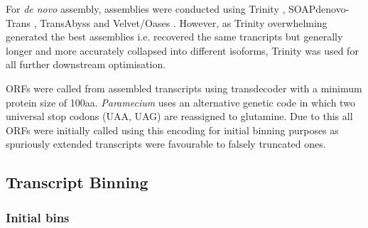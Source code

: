 For \textit{de novo} assembly, assemblies were conducted using Trinity \citep{Grabherr2011}, 
SOAPdenovo-Trans \citep{Xie2014}, TransAbyss \citep{Robertson2010} and Velvet/Oases \citep{Schulz2012}.
However, as Trinity overwhelming generated the best assemblies i.e. recovered the same trancripts
but generally longer and more accurately collapsed into different isoforms, Trinity was 
used for all further downstream optimisation.


ORFs were called from assembled transcripts using transdecoder \citep{Haas2013} with 
a minimum protein size of 100aa.  \textit{Paramecium} uses an alternative
genetic code in which two universal stop codons (UAA, UAG) are reassigned to glutamine.
Due to this all ORFs were initially called using this encoding for initial binning
purposes as spuriously extended transcripts were favourable to falsely truncated
ones.  


\subsection{Transcript Binning}

\subsubsection{Initial bins}

